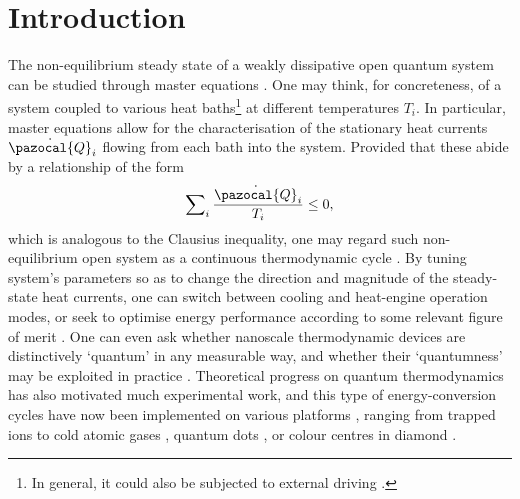 \documentclass[aps,pra,superscriptaddress,twocolumn,nofootinbib]{revtex4-2}
\begin{document}
\maketitle

\section{Introduction}

The non-equilibrium steady state of a weakly dissipative open quantum system can be studied through master equations \cite{bp}. One may think, for concreteness, of a system coupled to various heat baths\footnote{In general, it could also be subjected to external driving \cite{alicki1979,geva1992a,alicki2018}.} at different temperatures $ T_i $. In particular, master equations allow for the characterisation of the stationary heat currents $ \dot{\pazocal{Q}}_i $ flowing from each bath into the system. Provided that these abide by a relationship of the form \cite{alicki1979}
\begin{equation}\label{eq:clausius-inequality}
   \sum\nolimits_i \frac{\dot{\pazocal{Q}}_i}{T_i} \leq 0,
\end{equation}
which is analogous to the Clausius inequality, one may regard such non-equilibrium open system as a continuous thermodynamic cycle \cite{palao2001,kosloff2014}. By tuning system's parameters so as to change the direction and magnitude of the steady-state heat currents, one can switch between cooling and heat-engine operation modes, or seek to optimise energy performance according to some relevant figure of merit \cite{geva1992b,correa2014,whitney2014,feldmann2006,correa2015,abiuso2020}. One can even ask whether nanoscale thermodynamic devices are distinctively `quantum' in any measurable way, and whether their `quantumness' may be exploited in practice \cite{scully2011,raam2015,klatzow2019,gonzalez2019}. Theoretical progress on quantum thermodynamics has also motivated much experimental work, and this type of energy-conversion cycles have now been implemented on various platforms \cite{binder2018}, ranging from trapped ions \cite{rossnagel2016,lindenfels2019,maslennikov2019} to cold atomic gases \cite{brantut2013,zou2017}, quantum dots \cite{thierschmann2015}, or colour centres in diamond \cite{klatzow2019}. 
\end{document}
